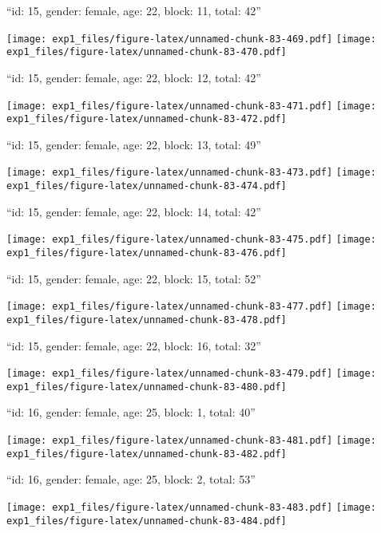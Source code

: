 \documentclass[11pt,,]{article}
\begin{document}
\newpage
[1] 

``id: 15, gender: female, age: 22, block: 11, total: 42''

\texttt{[image: exp1\_files/figure-latex/unnamed-chunk-83-469.pdf]}
\texttt{[image: exp1\_files/figure-latex/unnamed-chunk-83-470.pdf]}

\newpage
[1] 

``id: 15, gender: female, age: 22, block: 12, total: 42''

\texttt{[image: exp1\_files/figure-latex/unnamed-chunk-83-471.pdf]}
\texttt{[image: exp1\_files/figure-latex/unnamed-chunk-83-472.pdf]}

\newpage
[1] 

``id: 15, gender: female, age: 22, block: 13, total: 49''

\texttt{[image: exp1\_files/figure-latex/unnamed-chunk-83-473.pdf]}
\texttt{[image: exp1\_files/figure-latex/unnamed-chunk-83-474.pdf]}

\newpage
[1] 

``id: 15, gender: female, age: 22, block: 14, total: 42''

\texttt{[image: exp1\_files/figure-latex/unnamed-chunk-83-475.pdf]}
\texttt{[image: exp1\_files/figure-latex/unnamed-chunk-83-476.pdf]}

\newpage
[1] 

``id: 15, gender: female, age: 22, block: 15, total: 52''

\texttt{[image: exp1\_files/figure-latex/unnamed-chunk-83-477.pdf]}
\texttt{[image: exp1\_files/figure-latex/unnamed-chunk-83-478.pdf]}

\newpage
[1] 

``id: 15, gender: female, age: 22, block: 16, total: 32''

\texttt{[image: exp1\_files/figure-latex/unnamed-chunk-83-479.pdf]}
\texttt{[image: exp1\_files/figure-latex/unnamed-chunk-83-480.pdf]}

\newpage
[1] 

``id: 16, gender: female, age: 25, block: 1, total: 40''

\texttt{[image: exp1\_files/figure-latex/unnamed-chunk-83-481.pdf]}
\texttt{[image: exp1\_files/figure-latex/unnamed-chunk-83-482.pdf]}

\newpage
[1] 

``id: 16, gender: female, age: 25, block: 2, total: 53''

\texttt{[image: exp1\_files/figure-latex/unnamed-chunk-83-483.pdf]}
\texttt{[image: exp1\_files/figure-latex/unnamed-chunk-83-484.pdf]}
\end{document}
